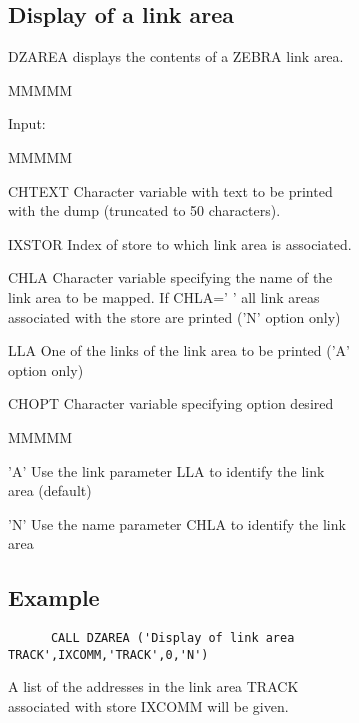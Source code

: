 \begin{figure}
\begin{figure}
\subsection{Display of a link area}
\par DZAREA displays the contents of a ZEBRA link area.
\begin{DL}{MMMMM}
\item[Input:
]
\begin{DL}{MMMMM}
\item[CHTEXT
]Character variable with text to be printed with the
dump (truncated to 50 characters).
\item[IXSTOR
]Index of store to which link area is associated.
\item[CHLA
]Character variable specifying the name of the link area to be mapped.
\newline If CHLA='  ' all link areas associated with the store are printed
('N' option only)
\item[LLA
]One of the links of the link area to be printed ('A' option only)
\item[CHOPT
]Character variable specifying option desired
\begin{DL}{MMMMM}
\item['A'
]Use the link parameter LLA to identify the link area (default)
\item['N'
]Use the name parameter CHLA to identify the link area
\end{DL}
\end{DL}
\end{DL}
\subsection{Example}
\begin{verbatim}
      CALL DZAREA ('Display of link area TRACK',IXCOMM,'TRACK',0,'N')
\end{verbatim}
A list of the addresses in the link area TRACK associated
with store IXCOMM will be given.

\end{figure}
\end{figure}
